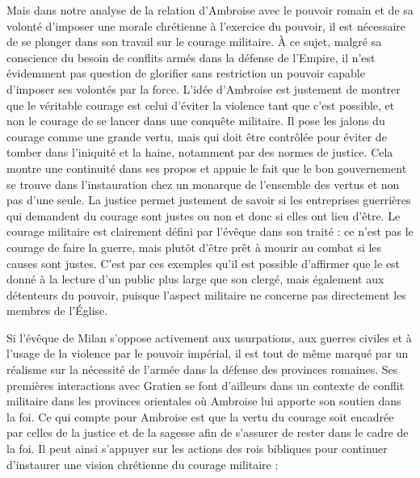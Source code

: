 \bigskip

Mais dans notre analyse de la relation d'Ambroise avec le pouvoir romain et de sa volonté d'imposer une morale chrétienne à l'exercice du pouvoir, il est nécessaire de se plonger dans son travail sur le courage militaire. À ce sujet, malgré sa conscience du besoin de conflits armés dans la défense de l'Empire, il n'est évidemment pas question de glorifier sans restriction un pouvoir capable d'imposer ses volontés par la force. L'idée d'Ambroise est justement de montrer que le véritable courage est celui d'éviter la violence tant que c'est possible, et non le courage de se lancer dans une conquête militaire. Il pose les jalons du courage comme une grande vertu, mais qui doit être contrôlée pour éviter de tomber dans l'iniquité et la haine, notamment par des normes de justice. Cela montre une continuité dans ses propos et appuie le fait que le bon gouvernement se trouve dans l'instauration chez un monarque de l'ensemble des vertus et non pas d'une seule. La justice permet justement de savoir si les entreprises guerrières qui demandent du courage sont justes ou non et donc si elles ont lieu d'être. Le courage militaire est clairement défini par l'évêque dans son traité : ce n'est pas le courage de faire la guerre, mais plutôt d'être prêt à mourir au combat si les causes sont justes\autocite[\nopp I, 196]{ambroise_devoirs_1}. C’est par ces exemples qu’il est possible d’affirmer que le  est donné à la lecture d’un public plus large que son clergé, mais également aux détenteurs du pouvoir, puisque l’aspect militaire ne concerne pas directement les membres de l’Église.

\bigskip

Si l'évêque de Milan s'oppose activement aux usurpations, aux guerres civiles et à l'usage de la violence par le pouvoir impérial, il est tout de même marqué par un réalisme sur la nécessité de l'armée dans la défense des provinces romaines. Ses premières interactions avec Gratien se font d'ailleurs dans un contexte de conflit militaire dans les provinces orientales où Ambroise lui apporte son soutien dans la foi\autocite[\nopp ec. 12, 1]{ambroise_csel_82_3}. Ce qui compte pour Ambroise est que la vertu du courage soit encadrée par celles de la justice et de la sagesse afin de s’assurer de rester dans le cadre de la foi. Il peut ainsi s’appuyer sur les actions des rois bibliques pour continuer d'instaurer une vision chrétienne du courage militaire :

\bigskip

